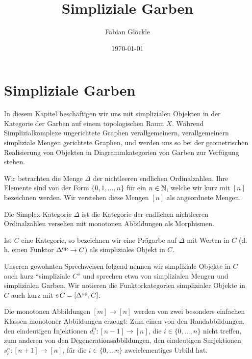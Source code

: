 



\title{Simpliziale Garben}
\author{Fabian Glöckle}
\date{\today}

\chapter{Simpliziale Garben}

In diesem Kapitel beschäftigen wir uns mit simplizialen Objekten in
der Kategorie der Garben auf einem topologischen Raum $X$. Während
Simplizialkomplexe ungerichtete Graphen verallgemeinern,
verallgemeinern simpliziale Mengen gerichtete Graphen, und werden uns
so bei der geometrischen Realisierung von Objekten in
Diagrammkategorien von Garben zur Verfügung stehen.

Wir betrachten die Menge $\Delta$ der nichtleeren endlichen
Ordinalzahlen. Ihre Elemente sind von der Form $\{0, 1, \dots, n\}$
für ein $n \in \mathbb{N}$, welche wir kurz mit $[n]$ bezeichnen werden. Wir
verstehen diese Mengen $[n]$ als angeordnete Mengen.

\begin{defn}
  Die Simplex-Kategorie $\Delta$ ist die Kategorie der endlichen
  nichtleeren Ordinalzahlen versehen mit monotonen Abbildungen als
  Morphismen.

  Ist $C$ eine Kategorie, so bezeichnen wir eine Prägarbe auf $\Delta$
  mit Werten in $C$ (d. h. einen Funktor $\Delta^\mathrm{op} \to C$) als
  simpliziales Objekt in $C$.
\end{defn}

Unseren gewohnten Sprechweisen folgend nennen wir simpliziale Objekte
in $C$ auch kurz ``simpliziale $C$'' und sprechen etwa von
simplizialen Mengen und simplizialen Garben. Wir notieren die
Funktorkategorien simplizialer Objekte in $C$ auch kurz mit $\operatorname{s} C =
[\Delta^\mathrm{op}, C]$.

Die monotonen Abbildungen $[m] \to [n]$ werden von zwei besonders
einfachen Klassen monotoner Abbildungen erzeugt: Zum einen von den
Randabbildungen, den eindeutigen Injektionen $d_i^n: [n - 1] \to [n]$,
die $i \in \{0, \dots, n\}$ nicht treffen, zum anderen von den
Degenerationsabbildungen, den eindeutigen Surjektionen $s_i^n: [n +
1] \to [n]$, für die $i \in \{0, \dots n\}$ zweielementiges Urbild
hat.

